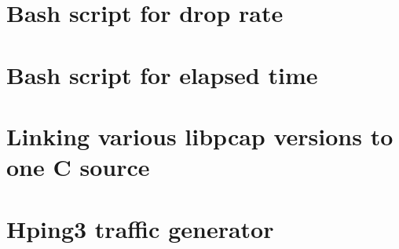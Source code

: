 \documentclass[12pt,a4paper,twoside]{report}
\begin{document}
\begin{appendices}
	\chapter{Bash script for drop rate} \label{appendix:script:droprate}
		
	\chapter{Bash script for elapsed time} \label{appendix:script:timed}
		
	\chapter{Linking various libpcap versions to one C source} \label{appendix:compilation:pcaps}
		
	\chapter{Hping3 traffic generator} \label{appendix:hping3}
		

\end{appendices}
\end{document}

